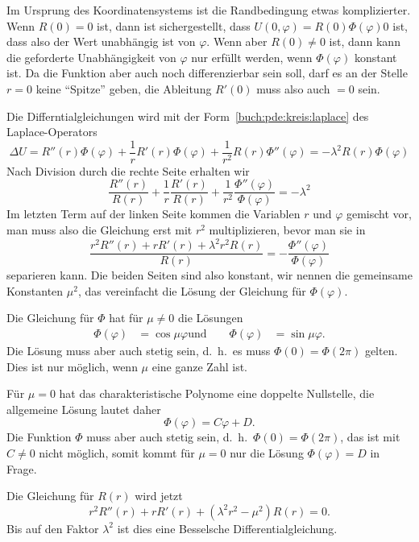 Im Ursprung des Koordinatensystems ist die Randbedingung etwas
komplizierter.
Wenn $R(0)=0$ ist, dann ist sichergestellt, dass
$U(0,\varphi)=R(0)\Phi(\varphi)0$ ist, dass also der Wert unabhängig
ist von $\varphi$.
Wenn aber $R(0)\ne 0$ ist, dann kann die geforderte Unabhängigkeit
von $\varphi$ nur erfüllt werden, wenn $\Phi(\varphi)$ konstant ist.
Da die Funktion aber auch noch differenzierbar sein soll, darf es
an der Stelle $r=0$ keine ``Spitze'' geben, die Ableitung $R'(0)$
muss also auch $=0$ sein.

Die Differntialgleichungen wird mit der Form~\eqref{buch:pde:kreis:laplace}
des Laplace-Operators
\[
\Delta U
=
R''(r) \Phi(\varphi)
+
\frac1r R'(r)\Phi(\varphi)
+
\frac{1}{r^2} R(r)\Phi''(\varphi)
=
-\lambda^2
R(r)\Phi(\varphi)
\]
Nach Division durch die rechte Seite erhalten wir
\[
\frac{R''(r)}{R(r)}
+
\frac1r \frac{R'(r)}{R(r)}
+
\frac{1}{r^2} \frac{\Phi''(\varphi)}{\Phi(\varphi)}
=
-\lambda^2
\]
Im letzten Term auf der linken Seite kommen die Variablen $r$ und $\varphi$
gemischt vor, man muss also die Gleichung erst mit $r^2$ multiplizieren,
bevor man sie in 
\[
\frac{r^2R''(r)+rR'(r)+\lambda^2 r^2R(r)}{R(r)}
=
-\frac{\Phi''(\varphi)}{\Phi(\varphi)}
\]
separieren kann.
Die beiden Seiten sind also konstant, wir nennen die gemeinsame
Konstanten $\mu^2$, das vereinfacht die Lösung der Gleichung
für $\Phi(\varphi)$.

Die Gleichung für $\Phi$ hat für $\mu\ne 0$ die Lösungen
\begin{align*}
\Phi(\varphi) &= \cos\mu\varphi
\text{und}\qquad
\Phi(\varphi) &= \sin\mu\varphi.
\end{align*}
Die Lösung muss aber auch stetig sein, d.~h.~es muss $\Phi(0)=\Phi(2\pi)$
gelten.
Dies ist nur möglich, wenn $\mu$ eine ganze Zahl ist.

Für $\mu=0$ hat das charakteristische Polynome eine doppelte Nullstelle,
die allgemeine Lösung lautet daher
\[
\Phi(\varphi)= C \varphi + D.
\]
Die Funktion $\Phi$ muss aber auch stetig sein, d.~h.~$\Phi(0)=\Phi(2\pi)$,
das ist mit $C\ne 0$ nicht möglich, somit kommt für $\mu=0$ nur die
Lösung $\Phi(\varphi)=D$ in Frage.

Die Gleichung für $R(r)$ wird jetzt
\begin{equation}
r^2R''(r) + rR'(r)+(\lambda^2 r^2-\mu^2)R(r)
=
0.
\label{buch:pde:kreis:Rdgl}
\end{equation}
Bis auf den Faktor $\lambda^2$ ist dies eine Besselsche Differentialgleichung.

